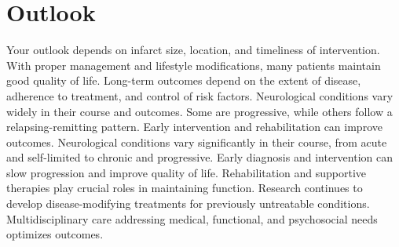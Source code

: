 \section{Outlook}
Your outlook depends on infarct size, location, and timeliness of intervention. With proper management and lifestyle modifications, many patients maintain good quality of life. Long-term outcomes depend on the extent of disease, adherence to treatment, and control of risk factors. Neurological conditions vary widely in their course and outcomes. Some are progressive, while others follow a relapsing-remitting pattern. Early intervention and rehabilitation can improve outcomes. Neurological conditions vary significantly in their course, from acute and self-limited to chronic and progressive. Early diagnosis and intervention can slow progression and improve quality of life. Rehabilitation and supportive therapies play crucial roles in maintaining function. Research continues to develop disease-modifying treatments for previously untreatable conditions. Multidisciplinary care addressing medical, functional, and psychosocial needs optimizes outcomes.
